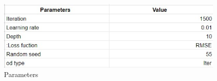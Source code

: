 \begin{figure}[h]
\label{bd}
\centering
\includegraphics[width= 11 cm]{cat1.jpg}
\caption{Parameters}
\end{figure}

 

\clearpage
{}
